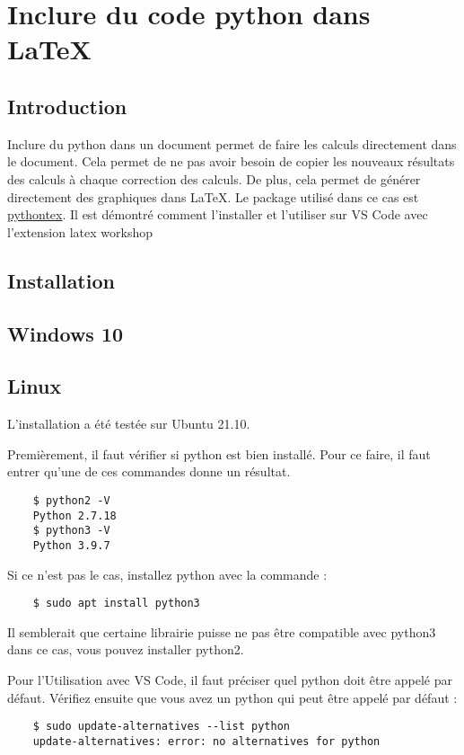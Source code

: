 \section{Inclure du code python dans \LaTeX}
\subsection{Introduction}
Inclure du python dans un document permet de faire les calculs directement dans le document.
Cela permet de ne pas avoir besoin de copier les nouveaux résultats des calculs à chaque correction des calculs.
De plus, cela permet de générer directement des graphiques dans \LaTeX.
Le package utilisé dans ce cas est \href{https://www.ctan.org/pkg/pythontex}{pythontex}.
Il est démontré comment l'installer et l'utiliser sur VS Code avec l'extension latex workshop

\subsection{Installation}
\subsection{Windows 10}

\subsection{Linux}
L'installation a été testée sur Ubuntu 21.10.

Premièrement, il faut vérifier si python est bien installé.
Pour ce faire, il faut entrer qu'une de ces commandes donne un résultat.
\begin{verbatim}
	$ python2 -V
	Python 2.7.18
	$ python3 -V
	Python 3.9.7
\end{verbatim}

Si ce n'est pas le cas, installez python avec la commande :
\begin{verbatim}
	$ sudo apt install python3
\end{verbatim}
Il semblerait que certaine librairie puisse ne pas être compatible avec python3 dans ce cas, vous pouvez installer python2.

Pour l'Utilisation avec VS Code, il faut préciser quel python doit être appelé par défaut.
Vérifiez ensuite que vous avez un python qui peut être appelé par défaut :
\begin{verbatim}
	$ sudo update-alternatives --list python
	update-alternatives: error: no alternatives for python
\end{verbatim}

